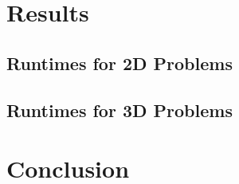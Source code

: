 \documentclass[conference]{IEEEtran}
\begin{document}
\section{Results}

\subsection{Runtimes for 2D Problems}

\subsection{Runtimes for 3D Problems}

\section{Conclusion}



\end{document}
